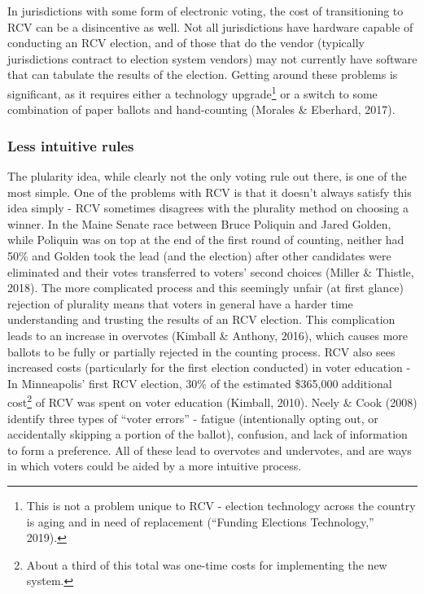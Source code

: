 \documentclass[12pt,twoside]{reedthesis}
\begin{document}
In jurisdictions with some form of electronic voting, the cost of transitioning to RCV can be a disincentive as well. Not all jurisdictions have hardware capable of conducting an RCV election, and of those that do the vendor (typically jurisdictions contract to election system vendors) may not currently have software that can tabulate the results of the election. Getting around these problems is significant, as it requires either a technology upgrade\footnote{This is not a problem unique to RCV - election technology across the country is aging and in need of replacement (``Funding Elections Technology,'' 2019).} or a switch to some combination of paper ballots and hand-counting (Morales \& Eberhard, 2017).

\hypertarget{less-intuitive-rules}{%
\subsubsection{Less intuitive rules}\label{less-intuitive-rules}}

The plularity idea, while clearly not the only voting rule out there, is one of the most simple. One of the problems with RCV is that it doesn't always satisfy this idea simply - RCV sometimes disagrees with the plurality method on choosing a winner. In the Maine Senate race between Bruce Poliquin and Jared Golden, while Poliquin was on top at the end of the first round of counting, neither had 50\% and Golden took the lead (and the election) after other candidates were eliminated and their votes transferred to voters' second choices (Miller \& Thistle, 2018). The more complicated process and this seemingly unfair (at first glance) rejection of plurality means that voters in general have a harder time understanding and trusting the results of an RCV election. This complication leads to an increase in overvotes (Kimball \& Anthony, 2016), which causes more ballots to be fully or partially rejected in the counting process. RCV also sees increased costs (particularly for the first election conducted) in voter education - In Minneapolis' first RCV election, 30\% of the estimated \$365,000 additional cost\footnote{About a third of this total was one-time costs for implementing the new system.} of RCV was spent on voter education (Kimball, 2010). Neely \& Cook (2008) identify three types of ``voter errors'' - fatigue (intentionally opting out, or accidentally skipping a portion of the ballot), confusion, and lack of information to form a preference. All of these lead to overvotes and undervotes, and are ways in which voters could be aided by a more intuitive process.
\end{document}
